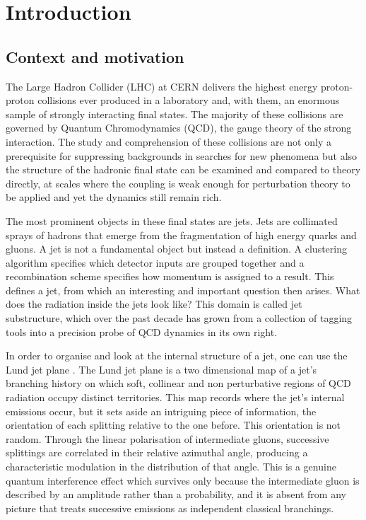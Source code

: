 \chapter{Introduction}
\label{cap:introducao}

\section{Context and motivation}
\label{sec:motivacao}

The Large Hadron Collider (LHC) at CERN delivers the highest energy proton-proton
collisions ever produced in a laboratory and, with them, an enormous sample of
strongly interacting final states. The majority of these collisions are governed
by Quantum Chromodynamics (QCD), the gauge theory of the strong interaction.
The study and comprehension of these collisions are not only a prerequisite for
suppressing backgrounds in searches for new phenomena but also the structure of
the hadronic final state can be examined and compared to theory directly, at scales
where the coupling is weak enough for perturbation theory to be applied and yet the
dynamics still remain rich.

The most prominent objects in these final states are jets. Jets are collimated sprays
of hadrons that emerge from the fragmentation of high energy quarks and gluons.
A jet is not a fundamental object but instead a definition. A clustering algorithm
specifies which detector inputs are grouped together and a recombination scheme
specifies how momentum is assigned to a result. This defines a jet, from which an
interesting and important question then arises. What does the radiation inside the jets look like?
This domain is called jet substructure, which over the past decade has grown from
a collection of tagging tools into a precision probe of QCD dynamics in its own right. 

In order to organise and look at the internal structure of a jet, one can use the Lund
jet plane \cite{Dreyer:2018nbf}. The Lund jet plane is a two dimensional map of a jet's
branching history on which soft, collinear and non perturbative regions of QCD radiation
occupy distinct territories. This map records where the jet's internal emissions occur, but
it sets aside an intriguing piece of information, the orientation of each splitting
relative to the one before. This orientation is not random. Through the linear polarisation
of intermediate gluons,
successive splittings are correlated in their relative azimuthal angle, producing
a characteristic modulation in the distribution of that angle. This is a genuine quantum
interference effect which survives only because the intermediate gluon is described by
an amplitude rather than a probability, and it is absent from any picture that treats successive
emissions as independent classical branchings.

